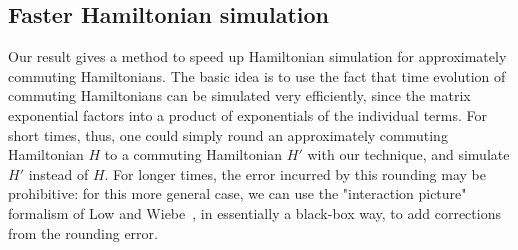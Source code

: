 \documentclass[a4paper,onecolumn,11pt]{quantumarticle}
\theoremstyle{plain}
\begin{document}
\subsection{Faster Hamiltonian simulation}\label{sec:hamiltonian-simulation}
Our result gives a method to speed up Hamiltonian simulation for approximately commuting Hamiltonians. The basic idea is to use the fact that time evolution of commuting Hamiltonians can be simulated very efficiently, since the matrix exponential factors into a product of exponentials of the individual terms. For short times, thus, one could simply round an approximately commuting Hamiltonian $H$ to a commuting Hamiltonian $H'$ with our technique, and simulate $H'$ instead of $H$. For longer times, the error incurred by this rounding may be prohibitive: for this more general case, we can use the "interaction picture" formalism of Low and Wiebe~\cite{low2018hamiltonian}, in essentially a black-box way, to add corrections from the rounding error. 
\end{document}

